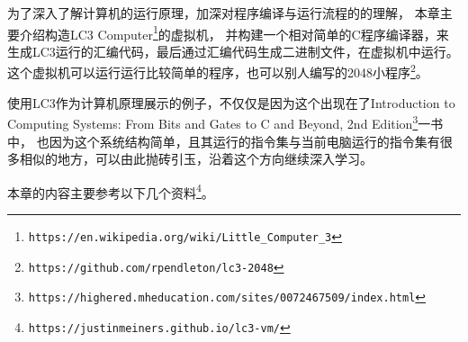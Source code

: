为了深入了解计算机的运行原理，加深对程序编译与运行流程的的理解，
本章主要介绍构造LC3 Computer\footnote{\nolinkurl{https://en.wikipedia.org/wiki/Little_Computer_3}}的虚拟机，
并构建一个相对简单的C程序编译器，来生成LC3运行的汇编代码，最后通过汇编代码生成二进制文件，在虚拟机中运行。
这个虚拟机可以运行运行比较简单的程序，也可以别人编写的2048小程序\footnote{\nolinkurl{https://github.com/rpendleton/lc3-2048}}。

使用LC3作为计算机原理展示的例子，不仅仅是因为这个出现在了Introduction to Computing Systems: From Bits and Gates to C and Beyond, 2nd Edition\footnote{\nolinkurl{https://highered.mheducation.com/sites/0072467509/index.html}}一书中，
也因为这个系统结构简单，且其运行的指令集与当前电脑运行的指令集有很多相似的地方，可以由此抛砖引玉，沿着这个方向继续深入学习。

本章的内容主要参考以下几个资料\footnote{\nolinkurl{https://justinmeiners.github.io/lc3-vm/}}。
